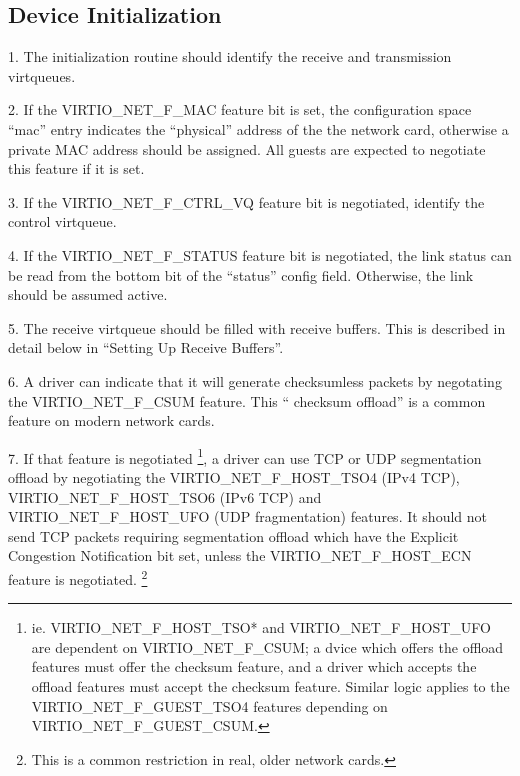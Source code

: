 \subsection{Device Initialization}\label{sec:Device Types / Network Device / Device Initialization}

1. The initialization routine should identify the receive and
  transmission virtqueues.

2. If the VIRTIO_NET_F_MAC feature bit is set, the configuration
  space “mac” entry indicates the “physical” address of the the
  network card, otherwise a private MAC address should be
  assigned. All guests are expected to negotiate this feature if
  it is set.

3. If the VIRTIO_NET_F_CTRL_VQ feature bit is negotiated,
  identify the control virtqueue.

4. If the VIRTIO_NET_F_STATUS feature bit is negotiated, the link
  status can be read from the bottom bit of the “status” config
  field. Otherwise, the link should be assumed active.

5. The receive virtqueue should be filled with receive buffers.
  This is described in detail below in “Setting Up Receive
  Buffers”.

6. A driver can indicate that it will generate checksumless
  packets by negotating the VIRTIO_NET_F_CSUM feature. This “
  checksum offload” is a common feature on modern network cards.

7. If that feature is negotiated
\footnote{ie. VIRTIO_NET_F_HOST_TSO* and VIRTIO_NET_F_HOST_UFO are
dependent on VIRTIO_NET_F_CSUM; a dvice which offers the offload
features must offer the checksum feature, and a driver which
accepts the offload features must accept the checksum feature.
Similar logic applies to the VIRTIO_NET_F_GUEST_TSO4 features
depending on VIRTIO_NET_F_GUEST_CSUM.
}, a driver can use TCP or UDP
  segmentation offload by negotiating the VIRTIO_NET_F_HOST_TSO4 (IPv4
  TCP), VIRTIO_NET_F_HOST_TSO6 (IPv6 TCP) and VIRTIO_NET_F_HOST_UFO
  (UDP fragmentation) features. It should not send TCP packets
  requiring segmentation offload which have the Explicit Congestion
  Notification bit set, unless the VIRTIO_NET_F_HOST_ECN feature is
  negotiated.
\footnote{This is a common restriction in real, older network cards.
}

